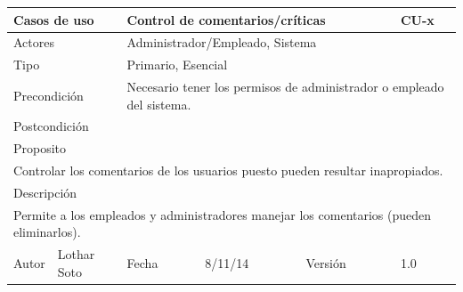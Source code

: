 \documentclass{article}
\begin{document}
\begin{table}[h]
\begin{tabular}{|l|l|l|l|l|l|}
\hline
\multicolumn{2}{|p{2cm}|}{Casos de uso}  & \multicolumn{3}{p{7cm}|}{Control de comentarios/críticas} & CU-x \\
\hline
\multicolumn{2}{|p{2cm}|}{Actores}       & \multicolumn{4}{p{8cm}|}{Administrador/Empleado, Sistema}        \\
\hline
\multicolumn{2}{|p{2cm}|}{Tipo}          & \multicolumn{4}{p{8cm}|}{Primario, Esencial}        \\
\hline
\multicolumn{2}{|p{2cm}|}{Precondición}  & \multicolumn{4}{p{8cm}|}{Necesario tener los permisos de administrador o empleado del sistema.}        \\
\hline
\multicolumn{2}{|p{2cm}|}{Postcondición} & \multicolumn{4}{p{8cm}|}{}        \\
\hline
\multicolumn{6}{|p{10cm}|}{Proposito}                                   \\
\hline
\multicolumn{6}{|p{10cm}|}{Controlar los comentarios de los usuarios puesto pueden resultar inapropiados.}                                            \\
\hline
\multicolumn{6}{|p{10cm}|}{Descripción}                                 \\
\hline
\multicolumn{6}{|p{10cm}|}{Permite a los empleados y administradores  manejar los comentarios (pueden eliminarlos).}                                            \\
\hline
Autor          &       Lothar Soto        & Fecha    &  8/11/14   &   Versión  & 1.0\\    
\hline
\end{tabular}
\end{table}
\end{document}
